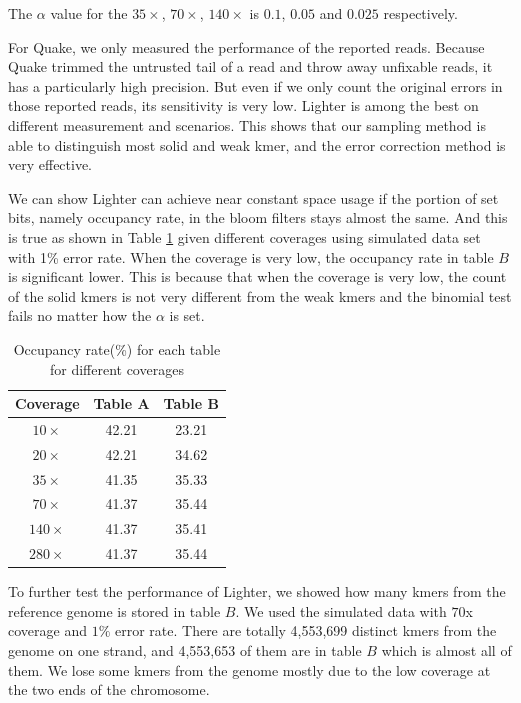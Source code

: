 \documentclass[10pt]{article}
\begin{document}
The $\alpha$ value for the $35\times$, $70\times$, $140\times$ is $0.1$, $0.05$ and $0.025$ respectively. 

For Quake, we only measured the performance of the reported reads. Because Quake trimmed the untrusted tail of a read and throw away unfixable reads, it has a particularly high precision. But even if we only count the original errors in those reported reads, its sensitivity is very low. Lighter is among the best on different measurement and scenarios. This shows that our sampling method is able to distinguish most solid and weak kmer, and the error correction method is very effective.

We can show Lighter can achieve near constant space usage if the portion of set bits, namely occupancy rate, in the bloom filters stays almost the same. And this is true as shown in Table \ref{table:bloom_occupancy_coverage} given different coverages using simulated data set with 1\% error rate. When the coverage is very low, the occupancy rate in table $B$ is significant lower. This is because that when the coverage is very low, the count of the solid kmers is not very different from the weak kmers and the binomial test fails no matter how the $\alpha$ is set.

\begin{table}
\begin{tabular}{|c|c|c|}\hline
Coverage & Table A & Table B \\ \hline
$10\times$	& 42.21	& 23.21 \\ \hline
$20\times$	& 42.21	& 34.62  \\ \hline
$35\times$ & 41.35 & 35.33 \\ \hline
$70\times$ &41.37  &  35.44 \\ \hline
$140\times$ & 41.37	& 35.41 \\ \hline
$280\times$ & 41.37	& 35.44 \\ \hline
\end{tabular}
\caption{Occupancy rate(\%) for each table for different coverages\label{table:bloom_occupancy_coverage}}
\end{table}

To further test the performance of Lighter, we showed how many kmers from the reference genome is stored in table $B$. We used the simulated data with $70$x coverage and $1\%$ error rate. There are totally 4,553,699 distinct kmers from the genome on one strand, and 4,553,653 of them are in table $B$ which is almost all of them. We lose some kmers from the genome mostly due to the low coverage at the two ends of the chromosome.
\end{document}
